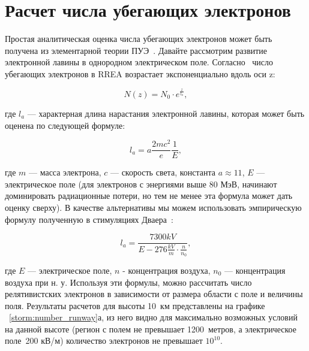 \section{Расчет числа убегающих электронов}\label{sec:thunderstorm/rrea}

Простая аналитическая оценка числа убегающих электронов может быть получена из элементарной теории ПУЭ~\cite{Gurevich2001ufn}. Давайте рассмотрим развитие электронной лавины в однородном электрическом поле. Согласно~\cite{Gurevich2001ufn} число убегающих электронов в RREA возрастает экспоненциально вдоль оси z:

\begin{equation}
\label{storm:exp}
N(z) = N_0 \cdot e^{\frac{z}{l_a}},
\end{equation}

где $l_a$ --- характерная длина нарастания электронной лавины, которая может быть оценена по следующей формуле:

\begin{equation}
l_a = a\frac{2 m c^{2}}{e} \frac{1}{E},
\end{equation}

где $m$ --- масса электрона, $c$ --- скорость света, константа $a \approx 11$, $E$ --- электрическое поле (для электронов с энергиями выше 80 МэВ, начинают доминировать радиационные потери, но тем не менее эта формула может дать оценку сверху). В качестве альтернативы мы можем использовать эмпирическую формулу полученную в стимуляциях Дваера~\cite{Dwyer2007}:

\begin{equation}
\label{storm:dwyer}
l_a = \frac{7300 kV}{E - 276 \frac{kV}{m} \cdot \frac{n}{n_0}},
\end{equation}

где $E$ --- электрическое поле, $n$ - концентрация воздуха, $n_0$ --- концентрация воздуха при н. у. Используя эти формулы, можно рассчитать число релятивистских электронов в зависимости от размера области с поле и величины поля. Результаты расчетов для высоты 10~км представлены на графике ~\ref{storm:number_runway}а, из него видно для максимально возможных условий на данной высоте (регион с полем не превышает 1200~метров, а электрическое поле~200 кВ/м) количество электронов не превышает $10^{10}$.

